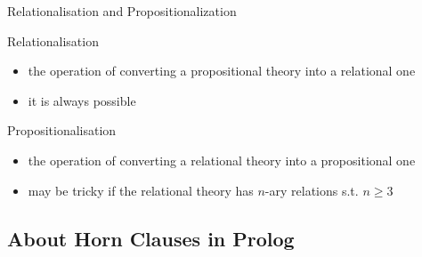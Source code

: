 \documentclass[presentation]{beamer}\mode<presentation>{\usetheme{AMSBolognaFC}}
\begin{document}
\begin{frame}{Relationalisation and Propositionalization}
    \begin{block}{Relationalisation}
        \begin{itemize}
            \item the operation of converting a propositional theory into a relational one
            \item it is always possible
        \end{itemize}
    \end{block}

    \begin{block}{Propositionalisation}
        \begin{itemize}
            \item the operation of converting a relational theory into a propositional one
            \item may be tricky if the relational theory has $n$-ary relations s.t. $n\geq3$
        \end{itemize}
    \end{block}
\end{frame}

\subsection{About Horn Clauses in Prolog}
\end{document}

